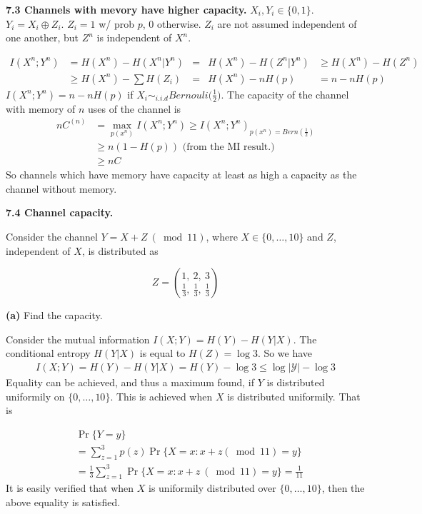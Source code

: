 \documentclass[10pt]{article}
\newcommand{\setbrace}[1]{{\{#1\}}}
\begin{document}
\begin{tiny}
\begin{multicols}{3}
\textbf{\scriptsize 7.3 Channels with mevory have higher capacity.}
    $X_i, Y_i \in \{0,1\}$.
    $Y_i = X_i \oplus Z_i$.
    $Z_i = 1$ w/ prob $p$, 0 otherwise.
    $Z_i$ are not assumed independent of one another, but $Z^n$ is independent of $X^n$.

\begin{align}
    I(X^n;Y^n) &= H(X^n) - H(X^n|Y^n) &=& H(X^n) - H(Z^n|Y^n) &\ge H(X^n) - H(Z^n) \nonumber\\
    &\ge H(X^n) - \sum H(Z_i) &=& H(X^n) - nH(p) &= n - nH(p) \nonumber
\end{align}
$I(X^n;Y^n) = n - nH(p)$ if $X_i \sim_{i.i.d} Bernouli\big(\frac{1}{2}\big)$.
The capacity of the channel with memory of $n$ uses of the channel is
\begin{align*}
    nC^{(n)} &= \max_{p(x^n)} I(X^n; Y^n) \ge I(X^n;Y^n)_{p(x^n)=Bern(\frac{1}{2})} \\
    &\ge n ( 1 - H(p)) \text{ (from the MI result.)} \\
    &\ge nC
\end{align*}
So channels which have memory have capacity at least as high a capacity as the channel without memory.

\textbf{\scriptsize 7.4 Channel capacity.}

Consider the channel $Y=X+Z\ (\bmod 11)$, where $X \in \setbrace{0,\dots,10}$ and $Z$, independent of $X$, is distributed as

\begin{equation*}
    Z = {{1,\ 2,\ 3}\choose{\frac{1}{3},\ \frac{1}{3},\ \frac{1}{3}}}
\end{equation*}


\textbf{(a)} Find the capacity.

Consider the mutual information $I(X;Y) = H(Y) - H(Y|X)$. The conditional
entropy $H(Y|X)$ is equal to $H(Z)=\log 3$.
So we have
\begin{eqnarray*}
    I(X;Y) = H(Y) - H(Y|X) = H(Y) - \log 3 
    \leq \log {\vert \mathcal{Y} \vert} - \log 3 \label{eq:7.4-cap}
\end{eqnarray*}
Equality can be achieved, and thus a maximum found, if $Y$ is distributed
uniformily on $\setbrace{0,\dots,10}$. This is achieved when $X$ is
distributed uniformily. That is


\begin{align*}
    &\Pr \setbrace{Y=y} \\
    &= \sum_{z=1}^{3}p(z) \Pr \setbrace{X=x : x+z (\bmod 11) = y} \\
    &= \frac{1}{3}\sum_{z=1}^{3} \Pr \setbrace{X = x : x+z\ (\bmod 11) = y} = \frac{1}{11}
\end{align*}
It is easily verified that when $X$ is uniformily distributed over
$\setbrace{0,\dots,10}$, then the above equality is satisfied.


\end{multicols}
\end{tiny}
\end{document}
